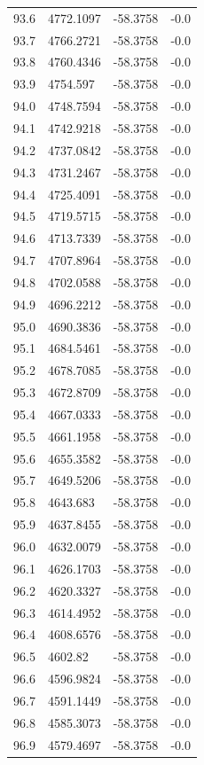 \begin{table}[H]
\begin{tabular}{llll}
93.6 & 4772.1097 & -58.3758 & -0.0 \\
93.7 & 4766.2721 & -58.3758 & -0.0 \\
93.8 & 4760.4346 & -58.3758 & -0.0 \\
93.9 & 4754.597 & -58.3758 & -0.0 \\
94.0 & 4748.7594 & -58.3758 & -0.0 \\
94.1 & 4742.9218 & -58.3758 & -0.0 \\
94.2 & 4737.0842 & -58.3758 & -0.0 \\
94.3 & 4731.2467 & -58.3758 & -0.0 \\
94.4 & 4725.4091 & -58.3758 & -0.0 \\
94.5 & 4719.5715 & -58.3758 & -0.0 \\
94.6 & 4713.7339 & -58.3758 & -0.0 \\
94.7 & 4707.8964 & -58.3758 & -0.0 \\
94.8 & 4702.0588 & -58.3758 & -0.0 \\
94.9 & 4696.2212 & -58.3758 & -0.0 \\
95.0 & 4690.3836 & -58.3758 & -0.0 \\
95.1 & 4684.5461 & -58.3758 & -0.0 \\
95.2 & 4678.7085 & -58.3758 & -0.0 \\
95.3 & 4672.8709 & -58.3758 & -0.0 \\
95.4 & 4667.0333 & -58.3758 & -0.0 \\
95.5 & 4661.1958 & -58.3758 & -0.0 \\
95.6 & 4655.3582 & -58.3758 & -0.0 \\
95.7 & 4649.5206 & -58.3758 & -0.0 \\
95.8 & 4643.683 & -58.3758 & -0.0 \\
95.9 & 4637.8455 & -58.3758 & -0.0 \\
96.0 & 4632.0079 & -58.3758 & -0.0 \\
96.1 & 4626.1703 & -58.3758 & -0.0 \\
96.2 & 4620.3327 & -58.3758 & -0.0 \\
96.3 & 4614.4952 & -58.3758 & -0.0 \\
96.4 & 4608.6576 & -58.3758 & -0.0 \\
96.5 & 4602.82 & -58.3758 & -0.0 \\
96.6 & 4596.9824 & -58.3758 & -0.0 \\
96.7 & 4591.1449 & -58.3758 & -0.0 \\
96.8 & 4585.3073 & -58.3758 & -0.0 \\
96.9 & 4579.4697 & -58.3758 & -0.0 \\

\end{tabular}
\end{table}
